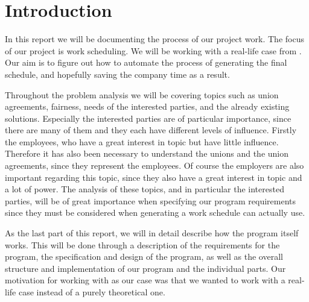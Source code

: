 \chapter*{Introduction}
In this report we will be documenting the process of our project work. The focus of our project is work scheduling. We will be working with a real-life case from \siemens. Our aim is to figure out how to automate the process of generating the final schedule, and hopefully saving the company time as a result.

Throughout the problem analysis we will be covering topics such as union agreements, fairness, needs of the interested parties, and the already existing solutions. Especially the interested parties are of particular importance, since there are many of them and they each have different levels of influence. Firstly the employees, who have a great interest in topic but have little influence. Therefore it has also been necessary to understand the unions and the union agreements, since they represent the employees. Of course the employers are also important regarding this topic, since they also have a great interest in topic and a lot of power. The analysis of these topics, and in particular the interested parties, will be of great importance when specifying our program requirements since they must be considered when generating a work schedule \siemens can actually use.

As the last part of this report, we will in detail describe how the program itself works. This will be done through a description of the requirements for the program, the specification and design of the program, as well as the overall structure and implementation of our program and the individual parts. 
Our motivation for working with \siemens as our case was that we wanted to work with a real-life case instead of a purely theoretical one.